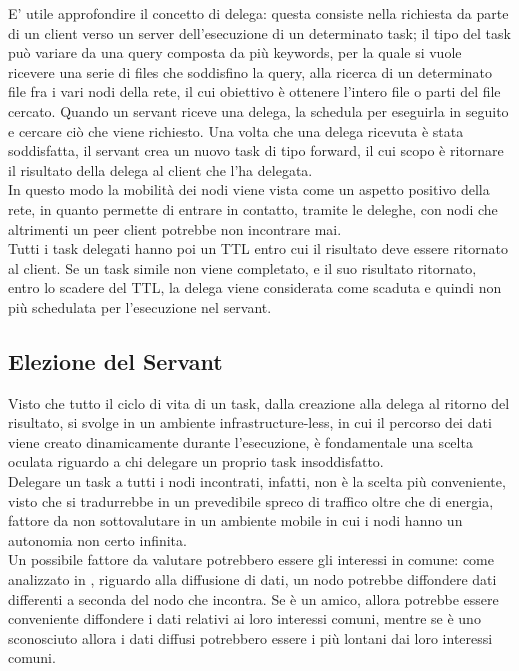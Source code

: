 E' utile approfondire il concetto di delega: questa consiste nella richiesta da parte di un client verso un server dell'esecuzione di un determinato task; il tipo del task pu\`{o} variare da una query composta da pi\`{u} keywords, per la quale si vuole ricevere una serie di files che soddisfino la query, alla ricerca di un determinato file fra i vari nodi della rete, il cui obiettivo \`{e} ottenere l'intero file o parti del file cercato. Quando un servant riceve una delega, la schedula per eseguirla in seguito e cercare ci\`{o} che viene richiesto. Una volta che una delega ricevuta \`{e} stata soddisfatta, il servant crea un nuovo task di tipo forward, il cui scopo \`{e} ritornare il risultato della delega al client che l'ha delegata. 
\\
In questo modo la mobilità dei nodi viene vista come un aspetto positivo della rete, in quanto permette di entrare in contatto, tramite le deleghe, con nodi che altrimenti un peer client potrebbe non incontrare mai.
\\
Tutti i task delegati hanno poi un TTL entro cui il risultato deve essere ritornato al client. Se un task simile non viene completato, e il suo risultato ritornato, entro lo scadere del TTL, la delega viene considerata come scaduta e quindi non più schedulata per l'esecuzione nel servant.
\\

\subsection{Elezione del Servant}
Visto che tutto il ciclo di vita di un task, dalla creazione alla delega al ritorno del risultato, si svolge in un ambiente infrastructure-less, in cui il percorso dei dati viene creato dinamicamente durante l'esecuzione, è fondamentale una scelta oculata riguardo a chi delegare un proprio task insoddisfatto. 
\\
Delegare un task a tutti i nodi incontrati, infatti, non è la scelta più conveniente, visto che si tradurrebbe in un prevedibile spreco di traffico oltre che di energia, fattore da non sottovalutare in un ambiente mobile in cui i nodi hanno un autonomia non certo infinita.
\\
Un possibile fattore da valutare potrebbero essere gli interessi in comune: come analizzato in \cite{socialNetworks}, riguardo alla diffusione di dati, un nodo potrebbe diffondere dati differenti a seconda del nodo che incontra. Se è un amico, allora potrebbe essere conveniente diffondere i dati relativi ai loro interessi comuni, mentre se è uno sconosciuto allora i dati diffusi potrebbero essere i più lontani dai loro interessi comuni.
\\

